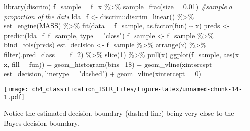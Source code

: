 \documentclass[
]{article}
\newenvironment{Shaded}{\begin{snugshade}}{\end{snugshade}}
\newcommand{\AttributeTok}[1]{\textcolor[rgb]{0.77,0.63,0.00}{#1}}
\newcommand{\CommentTok}[1]{\textcolor[rgb]{0.56,0.35,0.01}{\textit{#1}}}
\newcommand{\DecValTok}[1]{\textcolor[rgb]{0.00,0.00,0.81}{#1}}
\newcommand{\FloatTok}[1]{\textcolor[rgb]{0.00,0.00,0.81}{#1}}
\newcommand{\FunctionTok}[1]{\textcolor[rgb]{0.00,0.00,0.00}{#1}}
\newcommand{\NormalTok}[1]{#1}
\newcommand{\OtherTok}[1]{\textcolor[rgb]{0.56,0.35,0.01}{#1}}
\newcommand{\SpecialCharTok}[1]{\textcolor[rgb]{0.00,0.00,0.00}{#1}}
\newcommand{\StringTok}[1]{\textcolor[rgb]{0.31,0.60,0.02}{#1}}
\begin{document}
\begin{Shaded}
\begin{Highlighting}[]
\FunctionTok{library}\NormalTok{(discrim)}
\NormalTok{f\_sample }\OtherTok{=}\NormalTok{ f\_x }\SpecialCharTok{\%\textgreater{}\%} \FunctionTok{sample\_frac}\NormalTok{(}\AttributeTok{size =} \FloatTok{0.01}\NormalTok{)  }\CommentTok{\#sample a proportion of the data}
\NormalTok{lda\_f }\OtherTok{\textless{}{-}}\NormalTok{ discrim}\SpecialCharTok{::}\FunctionTok{discrim\_linear}\NormalTok{() }\SpecialCharTok{\%\textgreater{}\%}
  \FunctionTok{set\_engine}\NormalTok{(}\StringTok{\textquotesingle{}MASS\textquotesingle{}}\NormalTok{) }\SpecialCharTok{\%\textgreater{}\%}
  \FunctionTok{fit}\NormalTok{(}\AttributeTok{data =}\NormalTok{ f\_sample, }\FunctionTok{as.factor}\NormalTok{(fun) }\SpecialCharTok{\textasciitilde{}}\NormalTok{ x)}
\NormalTok{preds }\OtherTok{\textless{}{-}} \FunctionTok{predict}\NormalTok{(lda\_f, f\_sample, }\AttributeTok{type =} \StringTok{"class"}\NormalTok{)}
\NormalTok{f\_sample }\OtherTok{\textless{}{-}}\NormalTok{ f\_sample }\SpecialCharTok{\%\textgreater{}\%} \FunctionTok{bind\_cols}\NormalTok{(preds)}
\NormalTok{est\_decision }\OtherTok{\textless{}{-}}\NormalTok{ f\_sample }\SpecialCharTok{\%\textgreater{}\%} \FunctionTok{arrange}\NormalTok{(x) }\SpecialCharTok{\%\textgreater{}\%} \FunctionTok{filter}\NormalTok{(.pred\_class }\SpecialCharTok{==} \StringTok{\textquotesingle{}f\_2\textquotesingle{}}\NormalTok{) }\SpecialCharTok{\%\textgreater{}\%}
  \FunctionTok{slice}\NormalTok{(}\DecValTok{1}\NormalTok{) }\SpecialCharTok{\%\textgreater{}\%} \FunctionTok{pull}\NormalTok{(x)}
\FunctionTok{ggplot}\NormalTok{(f\_sample, }\FunctionTok{aes}\NormalTok{(}\AttributeTok{x =}\NormalTok{ x, }\AttributeTok{fill =}\NormalTok{ fun)) }\SpecialCharTok{+}
  \FunctionTok{geom\_histogram}\NormalTok{(}\AttributeTok{bins=}\DecValTok{18}\NormalTok{) }\SpecialCharTok{+}
  \FunctionTok{geom\_vline}\NormalTok{(}\AttributeTok{xintercept =}\NormalTok{ est\_decision, }\AttributeTok{linetype =} \StringTok{"dashed"}\NormalTok{) }\SpecialCharTok{+}
  \FunctionTok{geom\_vline}\NormalTok{(}\AttributeTok{xintercept =} \DecValTok{0}\NormalTok{)}
\end{Highlighting}
\end{Shaded}

\texttt{[image: ch4\_classification\_ISLR\_files/figure-latex/unnamed-chunk-14-1.pdf]}

Notice the estimated decision boundary (dashed line) being very close to
the Bayes decision boundary.
\end{document}
